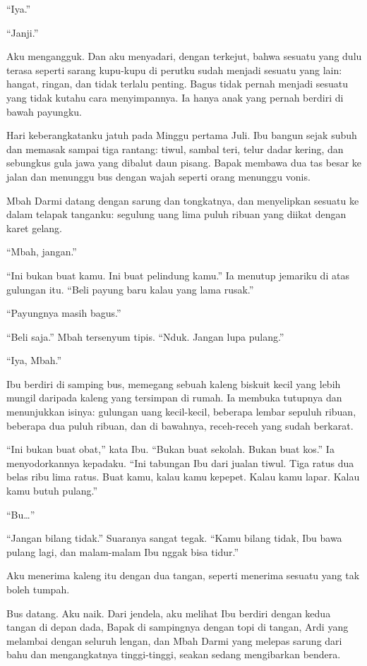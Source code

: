 \documentclass[11pt,twoside,openany]{book}
\makeatletter
\newcommand{\scenebreak}{\par\vspace{0.9em}{\centering\textsc{*\hspace{0.7em}*\hspace{0.7em}*}\par}\vspace{0.9em}\@afterindentfalse\@afterheading}
\makeatother
\begin{document}
``Iya.''

``Janji.''

Aku mengangguk. Dan aku menyadari, dengan terkejut, bahwa sesuatu yang dulu terasa seperti sarang kupu-kupu di perutku sudah menjadi sesuatu yang lain: hangat, ringan, dan tidak terlalu penting. Bagus tidak pernah menjadi sesuatu yang tidak kutahu cara menyimpannya. Ia hanya anak yang pernah berdiri di bawah payungku.

\scenebreak
Hari keberangkatanku jatuh pada Minggu pertama Juli. Ibu bangun sejak subuh dan memasak sampai tiga rantang: tiwul, sambal teri, telur dadar kering, dan sebungkus gula jawa yang dibalut daun pisang. Bapak membawa dua tas besar ke jalan dan menunggu bus dengan wajah seperti orang menunggu vonis.

Mbah Darmi datang dengan sarung dan tongkatnya, dan menyelipkan sesuatu ke dalam telapak tanganku: segulung uang lima puluh ribuan yang diikat dengan karet gelang.

``Mbah, jangan.''

``Ini bukan buat kamu. Ini buat pelindung kamu.'' Ia menutup jemariku di atas gulungan itu. ``Beli payung baru kalau yang lama rusak.''

``Payungnya masih bagus.''

``Beli saja.'' Mbah tersenyum tipis. ``Nduk. Jangan lupa pulang.''

``Iya, Mbah.''

Ibu berdiri di samping bus, memegang sebuah kaleng biskuit kecil yang lebih mungil daripada kaleng yang tersimpan di rumah. Ia membuka tutupnya dan menunjukkan isinya: gulungan uang kecil-kecil, beberapa lembar sepuluh ribuan, beberapa dua puluh ribuan, dan di bawahnya, receh-receh yang sudah berkarat.

``Ini bukan buat obat,'' kata Ibu. ``Bukan buat sekolah. Bukan buat kos.'' Ia menyodorkannya kepadaku. ``Ini tabungan Ibu dari jualan tiwul. Tiga ratus dua belas ribu lima ratus. Buat kamu, kalau kamu kepepet. Kalau kamu lapar. Kalau kamu butuh pulang.''

``Bu\ldots{}''

``Jangan bilang tidak.'' Suaranya sangat tegak. ``Kamu bilang tidak, Ibu bawa pulang lagi, dan malam-malam Ibu nggak bisa tidur.''

Aku menerima kaleng itu dengan dua tangan, seperti menerima sesuatu yang tak boleh tumpah.

Bus datang. Aku naik. Dari jendela, aku melihat Ibu berdiri dengan kedua tangan di depan dada, Bapak di sampingnya dengan topi di tangan, Ardi yang melambai dengan seluruh lengan, dan Mbah Darmi yang melepas sarung dari bahu dan mengangkatnya tinggi-tinggi, seakan sedang mengibarkan bendera.
\end{document}
